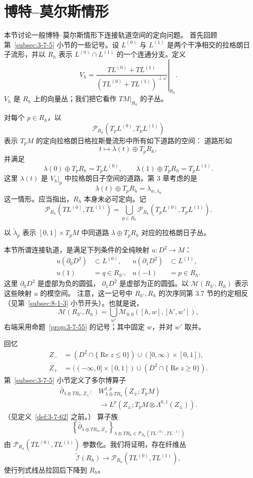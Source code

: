 
\section{博特--莫尔斯情形}
\label{sec:8-8}

本节讨论一般博特--莫尔斯情形下连接轨道空间的定向问题。
首先回顾第~\ref{subsec:3-7-5} 小节的一些记号。设 $L^{(0)}$ 与
$L^{(1)}$ 是两个干净相交的拉格朗日子流形，并以 $R_h$ 表示
$L^{(0)}\cap L^{(1)}$ 的一个连通分支。定义
\[
 V_h=
 \left.
 \frac{TL^{(0)}+TL^{(1)}}
 {(TL^{(0)}+TL^{(1)})^{\perp\omega}}
 \right|_{R_h}.
\]
$V_h$ 是 $R_h$ 上的向量丛；我们把它看作 $TM|_{R_h}$ 的子丛。

对每个 $p\in R_h$，以
\[
 \mathcal P_{R_h}(T_pL^{(0)},T_pL^{(1)})
\]
表示 $T_pM$ 的定向拉格朗日格拉斯曼流形中所有如下道路的空间：
道路形如
\[
 t\longmapsto\lambda(t)\oplus T_pR_h,
\]
并满足
\[
 \lambda(0)\oplus T_pR_h=T_pL^{(0)},\qquad
 \lambda(1)\oplus T_pR_h=T_pL^{(1)}.
\]
这里 $\lambda(t)$ 是 $V_h|_p$ 中拉格朗日子空间的道路。第 3 章考虑的是
\[
 \lambda(t)\oplus T_pR_h=\lambda_{w,\lambda_0}
\]
这一情形。应当指出，$R_h$ 本身未必可定向。记
\[
 \mathcal P_{R_h}(TL^{(0)},TL^{(1)})
 =
 \bigcup_{p\in R_h}
 \mathcal P_{R_h}(T_pL^{(0)},T_pL^{(1)}).
\]

以 $\widetilde\lambda_p$ 表示 $[0,1]\times T_pM$ 中同道路
$\lambda\oplus T_pR_h$ 对应的拉格朗日子丛。

本节所谓连接轨道，是满足下列条件的全纯映射
$u\colon D^2\to M$：
\[
\begin{aligned}
 u(\partial_0D^2)&\subset L^{(0)},&
 u(\partial_1D^2)&\subset L^{(1)},\\
 u(1)&=q\in R_{h'},&
 u(-1)&=p\in R_h.
\end{aligned}
\]
这里 $\partial_0D^2$ 是虚部为负的圆弧，
$\partial_1D^2$ 是虚部为正的圆弧。以
$\mathcal M(R_{h'},R_h)$ 表示这些映射 $u$ 的模空间。
注意，这一记号中 $R_{h'},R_h$ 的次序同第 3.7 节的约定相反
（见第~\ref{subsec:8-1-3} 小节开头）。也就是说，
\[
 \mathcal M(R_{h'},R_h)
 =
 \bigcup_{w'}
 \mathcal M_{0,0}([h,w],[h',w']),
\]
右端采用命题~\ref{prop:3-7-55} 的记号；其中固定 $w$，并对 $w'$ 取并。

回忆
\[
\begin{aligned}
 Z_-&=(D^2\cap\{\operatorname{Re}z\leq0\})
      \cup([0,\infty)\times[0,1]),\\
 Z_+&= ((-\infty,0]\times[0,1])
      \cup(D^2\cap\{\operatorname{Re}z\geq0\}).
\end{aligned}
\]
第~\ref{subsec:3-7-5} 小节定义了多尔博算子
\[
\begin{aligned}
 \bar\partial_{\lambda\oplus TR_h,Z_\pm}\colon&
 W_{\lambda\oplus TR_h}^{1,p}(Z_\pm;T_pM)\\
 &\longrightarrow
 L^p(Z_\pm;T_pM\otimes\Lambda^{0,1}(Z_\pm)).
\end{aligned}
\]
（见定义~\ref{def:3-7-62} 之前。）%
算子族
\[
 \left\{
 \bar\partial_{\lambda\oplus TR_h,Z_\pm}
 \right\}_{\lambda\oplus TR_h\in
 \mathcal P_{R_h}(TL^{(0)},TL^{(1)})}
\]
由 $\mathcal P_{R_h}(TL^{(0)},TL^{(1)})$ 参数化。我们将证明，存在纤维丛
\[
 \widetilde{\mathcal I}(R_h)
 \longrightarrow
 \mathcal P_{R_h}(TL^{(0)},TL^{(1)}),
\]
使行列式线丛拉回后下降到 $R_h$。

